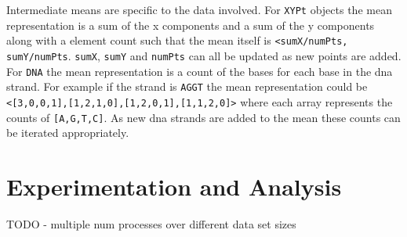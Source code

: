 \documentclass[12pt]{article}
\newcommand{\ttt}{\texttt}
\begin{document}
Intermediate means are specific to the data involved. For \ttt{XYPt} objects the mean representation is a sum of the x components and a sum of the y components along with a element count such that the mean itself is \ttt{<sumX/numPts, sumY/numPts}. \ttt{sumX}, \ttt{sumY} and \ttt{numPts} can all be updated as new points are added. For \ttt{DNA} the mean representation is a count of the bases for each base in the dna strand. For example if the strand is \ttt{AGGT} the mean representation could be \ttt{<[3,0,0,1],[1,2,1,0],[1,2,0,1],[1,1,2,0]>} where each array represents the counts of \ttt{[A,G,T,C]}. As new dna strands are added to the mean these counts can be iterated appropriately.


\section{Experimentation and Analysis}

TODO - multiple num processes over different data set sizes
\end{document}
